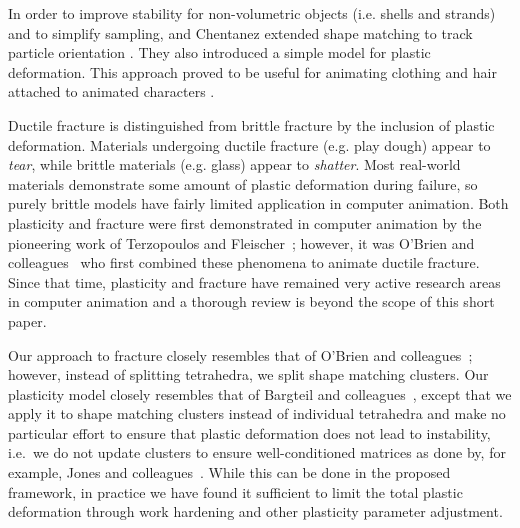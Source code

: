 \documentclass[conference]{acmsiggraph}
\begin{document}
In order to improve stability for non-volumetric objects (i.e. shells and strands) and to simplify sampling, \Mueller and Chentanez extended shape matching to track particle orientation \cite{muller2011solid}.   They also introduced a simple model for plastic deformation.  This approach proved to be useful for animating clothing and hair attached to animated characters \cite{muller2011adding}.


Ductile fracture is distinguished from brittle fracture by the inclusion of plastic deformation.  Materials undergoing ductile
fracture (e.g. play dough) appear to {\em tear}, while brittle materials (e.g. glass) appear to {\em shatter}.  Most
real-world materials demonstrate some amount of plastic deformation during failure, so purely brittle models have fairly limited
application in computer animation.  
Both plasticity and fracture
were first demonstrated in computer animation by the pioneering work of Terzopoulos and Fleischer~; 
however, it was O'Brien and colleagues~
who first combined these phenomena to animate ductile fracture.  Since that time, plasticity and fracture have
remained very active research areas in computer animation and a thorough review is beyond the scope of this short paper.

Our approach 
to fracture closely resembles that of O'Brien and colleagues~; however, instead of splitting tetrahedra,
we split shape matching clusters.  Our plasticity model closely resembles that of Bargteil and colleagues~, except that
we apply it to shape matching clusters instead of individual tetrahedra and make no particular effort to ensure that plastic deformation does not
lead to instability, i.e.~we do not update clusters to ensure well-conditioned matrices as done by, for example, Jones and colleagues~.
While this can be done in the proposed framework, in practice we have found it sufficient to limit the total plastic deformation through work hardening and other plasticity parameter adjustment.
\end{document}
